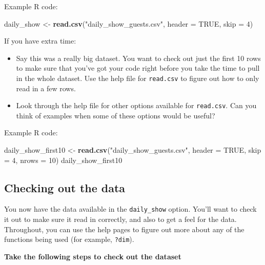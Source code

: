 \documentclass[]{book}
\makeatletter
\newenvironment{Shaded}{\begin{snugshade}}{\end{snugshade}}
\newcommand{\KeywordTok}[1]{\textcolor[rgb]{0.13,0.29,0.53}{\textbf{#1}}}
\newcommand{\DataTypeTok}[1]{\textcolor[rgb]{0.13,0.29,0.53}{#1}}
\newcommand{\DecValTok}[1]{\textcolor[rgb]{0.00,0.00,0.81}{#1}}
\newcommand{\StringTok}[1]{\textcolor[rgb]{0.31,0.60,0.02}{#1}}
\newcommand{\OtherTok}[1]{\textcolor[rgb]{0.56,0.35,0.01}{#1}}
\newcommand{\NormalTok}[1]{#1}
\providecommand{\tightlist}{%
  \setlength{\itemsep}{0pt}\setlength{\parskip}{0pt}}
\newenvironment{kframe}{%
\medskip{}
\setlength{\fboxsep}{.8em}
 \def\at@end@of@kframe{}%
 \ifinner\ifhmode%
  \def\at@end@of@kframe{\end{minipage}}%
  \begin{minipage}{\columnwidth}%
 \fi\fi%
 \def\FrameCommand##1{\hskip\@totalleftmargin \hskip-\fboxsep
 \colorbox{shadecolor}{##1}\hskip-\fboxsep
     \hskip-\linewidth \hskip-\@totalleftmargin \hskip\columnwidth}%
 \MakeFramed {\advance\hsize-\width
   \@totalleftmargin\z@ \linewidth\hsize
   \@setminipage}}%
 {\par\unskip\endMakeFramed%
 \at@end@of@kframe}
\renewenvironment{Shaded}{\begin{kframe}}{\end{kframe}}
\theoremstyle{definition}
\theoremstyle{definition}
\theoremstyle{definition}
\theoremstyle{remark}
\makeatother
\begin{document}
Example R code:

\begin{Shaded}
\begin{Highlighting}[]
\NormalTok{daily_show <-}\StringTok{ }\KeywordTok{read.csv}\NormalTok{(}\StringTok{"daily_show_guests.csv"}\NormalTok{, }\DataTypeTok{header =} \OtherTok{TRUE}\NormalTok{, }\DataTypeTok{skip =} \DecValTok{4}\NormalTok{)}
\end{Highlighting}
\end{Shaded}

If you have extra time:

\begin{itemize}
\tightlist
\item
  Say this was a really big dataset. You want to check out just the
  first 10 rows to make sure that you've got your code right before you
  take the time to pull in the whole dataset. Use the help file for
  \texttt{read.csv} to figure out how to only read in a few rows.
\item
  Look through the help file for other options available for
  \texttt{read.csv}. Can you think of examples when some of these
  options would be useful?
\end{itemize}

Example R code:

\begin{Shaded}
\begin{Highlighting}[]
\NormalTok{daily_show_first10 <-}\StringTok{ }\KeywordTok{read.csv}\NormalTok{(}\StringTok{"daily_show_guests.csv"}\NormalTok{, }\DataTypeTok{header =} \OtherTok{TRUE}\NormalTok{,}
                       \DataTypeTok{skip =} \DecValTok{4}\NormalTok{, }\DataTypeTok{nrows =} \DecValTok{10}\NormalTok{)}
\NormalTok{daily_show_first10}
\end{Highlighting}
\end{Shaded}

\subsection{Checking out the data}\label{checking-out-the-data}

You now have the data available in the \texttt{daily\_show} option.
You'll want to check it out to make sure it read in correctly, and also
to get a feel for the data. Throughout, you can use the help pages to
figure out more about any of the functions being used (for example,
\texttt{?dim}).

\textbf{Take the following steps to check out the dataset}
\end{document}
